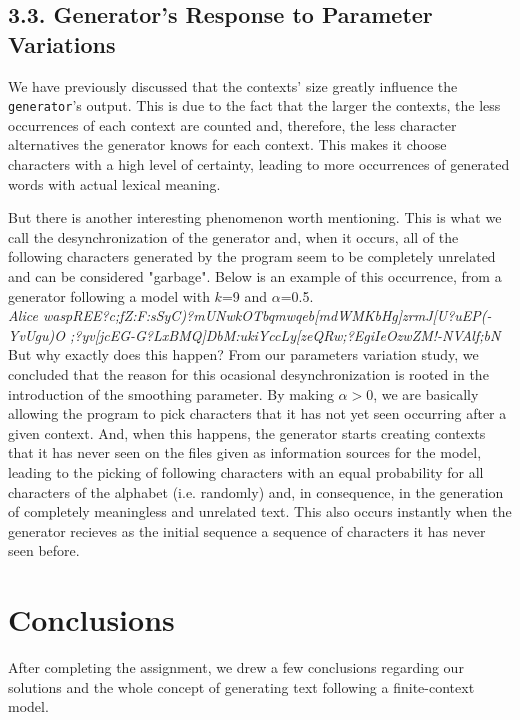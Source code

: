 \documentclass[12pt]{article}
\begin{document}
\subsection*{3.3. Generator's Response to Parameter Variations}

We have previously discussed that the contexts' size greatly influence the
\texttt{generator}'s output.
This is due to the fact that the larger the contexts, the less occurrences
of each context are counted and, therefore, the less character alternatives
the generator knows for each context.
This makes it choose characters with a high level of certainty, leading to
more occurrences of generated words with actual lexical meaning.

But there is another interesting phenomenon worth mentioning.
This is what we call the desynchronization of the generator and, when it occurs,
all of the following characters generated by the program seem to be completely
unrelated and can be considered "garbage".
Below is an example of this occurrence, from a generator following a model
with \(k\)=9 and $\alpha$=0.5.\\

{\it Alice waspREE?c;fZ:F:sSyC)?mUNwkOTbqmwqeb[mdWMKbHg]zrmJ[U?uEP(-YvUgu)O ;?yv[jcEG-G?LxBMQ]DbM:ukiYccLy[zeQRw;?EgiIeOzwZM!-NVAlf;bN \/}
\\

But why exactly does this happen? 
From our parameters variation study, we concluded that the reason for this
ocasional desynchronization is rooted in the introduction of the smoothing
parameter.
By making $\alpha$$>$0, we are basically allowing the program to pick characters
that it has not yet seen occurring after a given context.
And, when this happens, the generator starts creating contexts that it has
never seen on the files given as information sources for the model, leading
to the picking of following characters with an equal probability for all
characters of the alphabet (i.e. randomly) and, in consequence, in the 
generation of completely meaningless and unrelated text.
This also occurs instantly when the generator recieves as the initial sequence
a sequence of characters it has never seen before.

\newpage
\section*{Conclusions}

After completing the assignment, we drew a few conclusions regarding our 
solutions and the whole concept of generating text following a finite-context
model.
\end{document}
